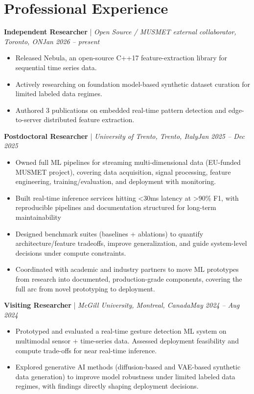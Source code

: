 \documentclass[11pt]{article}
\newenvironment{cvrole}[5]{%
  \par\noindent\textbf{\large #1} | \textit{\small #2, #3}\hfill \textit{\small #4 -- #5}\par
  \begin{itemize}[leftmargin=2em, itemsep=-0.3em, topsep=-0.5em]%
}{%
  \end{itemize}\par\noindent\mbox{}\par\vspace{0.1em}%
}
\begin{document}
\section*{Professional Experience}


\begin{cvrole}{Independent Researcher}{Open Source / MUSMET external collaborator}{Toronto, ON}{Jan 2026}{present}
    \item Released Nebula, an open-source C++17 feature-extraction library for sequential time series data.
    \item Actively researching on foundation model-based synthetic dataset curation for limited labeled data regimes.
    \item Authored 3 publications on embedded real-time pattern detection and edge-to-server distributed feature extraction.
\end{cvrole}




\begin{cvrole}{Postdoctoral Researcher}{University of Trento}{Trento, Italy}{Jan 2025}{Dec 2025}

    \item Owned full ML pipelines for streaming multi-dimensional data (EU-funded MUSMET project), covering data acquisition, signal processing, feature engineering, training/evaluation, and deployment with monitoring.
    \item Built real-time inference services hitting <30ms latency at >90\% F1, with reproducible pipelines and documentation structured for long-term maintainability
    \item Designed benchmark suites (baselines + ablations) to quantify architecture/feature tradeoffs, improve generalization, and guide system-level decisions under compute constraints.
    \item Coordinated with academic and industry partners to move ML prototypes from research into documented, production-grade components, covering the full arc from novel prototyping to deployment.
\end{cvrole}




\newpage
\begin{cvrole}{Visiting Researcher}{McGill University}{Montreal, Canada}{May 2024}{Aug 2024}
    \item Prototyped and evaluated a real-time gesture detection ML system on multimodal sensor + time-series data. Assessed deployment feasibility and compute trade-offs for near real-time inference.
    \item Explored generative AI methods (diffusion-based and VAE-based synthetic data generation) to improve model robustness under limited labeled data regimes, with findings directly shaping deployment decisions.
\end{cvrole}
\end{document}
